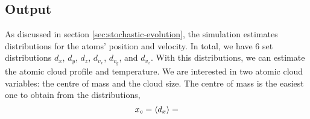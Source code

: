\subsection{Output}
\label{sec:output}

As discussed in section \ref{sec:stochastic-evolution}, the simulation estimates distributions for the atoms' position and velocity. In total, we have 6 set distributions $ d_x $, $ d_y $, $ d_z $, $ d_{v_x} $, $ d_{v_y} $, and $ d_{v_z} $. With this distributions, we can estimate the atomic cloud profile and temperature. We are interested in two atomic cloud variables: the centre of mass and the cloud size. The centre of mass is the easiest one to obtain from the distributions,
\begin{equation}
    x_c = \braket{d_x} =
\end{equation}
